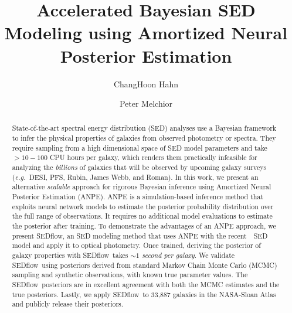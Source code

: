 \documentclass[12pt, letterpaper, preprint, comicneue]{aastex63}
\newcommand{\eg}{\emph{e.g.}}
\newcommand{\sedflow}{{\sc SEDflow}}
\begin{document}
 \sloppy\sloppypar\frenchspacing 

\title{Accelerated Bayesian SED Modeling using Amortized Neural Posterior Estimation}

\author[0000-0003-1197-0902]{ChangHoon Hahn}

\author[0000-0002-8873-5065]{Peter Melchior}

\begin{abstract}
    State-of-the-art spectral energy distribution (SED) analyses use a
    Bayesian framework to infer the physical properties of galaxies from
    observed photometry or spectra.
    They require sampling from a high dimensional space of SED model parameters
    and take $>10-100$ CPU hours per galaxy, which renders them practically
    infeasible for analyzing the {\em billions} of galaxies that will be
    observed by upcoming galaxy surveys
    (\eg~DESI, PFS, Rubin, James Webb, and Roman). 
    In this work, we present an alternative \emph{scalable} approach for
    rigorous Bayesian inference using Amortized Neural Posterior
    Estimation (ANPE). 
    ANPE is a simulation-based inference method that exploits neural network
    models to estimate the posterior probability distribution over the full
    range of observations.
    It requires no additional model evaluations to estimate the posterior after
    training. 
    To demonstrate the advantages of an ANPE approach, we present \sedflow, an
    SED modeling method that uses ANPE with the recent~\cite{hahn2022}~SED model 
    and apply it to optical photometry. 
    Once trained, deriving the posterior of galaxy properties with 
    \sedflow~takes \emph{${\sim}1$ second per galaxy}. 
    We validate \sedflow~using posteriors derived from standard
    Markov Chain Monte Carlo (MCMC) sampling and synthetic observations, with
    known true parameter values.  
    The \sedflow~posteriors are in excellent agreement with both the MCMC
    estimates and the true posteriors. 
    Lastly, we apply \sedflow~to 33,887 galaxies in the NASA-Sloan Atlas and
    publicly release their posteriors.
\end{abstract}
\end{document}
